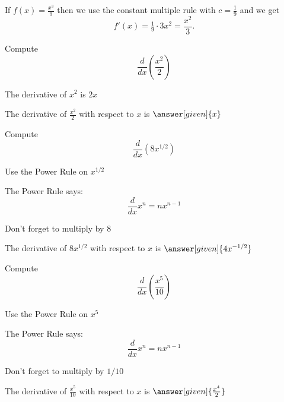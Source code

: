 \documentclass{ximera}
\begin{document}
\begin{example} %
 If $f(x) = \frac{x^3}{9}$ then  we use the constant multiple rule with $c = \frac19$ and we get 
\[
f'(x) = \tfrac19 \cdot 3x^2 
= \frac{x^2}{3}.
\]
\end{example}

\begin{problem} %
  Compute 
  \[
  \frac{d}{dx} \left(\frac{x^2}{2}\right)
  \]
  
    \begin{hint}
      The derivative of $x^2$ is $2x$
    \end{hint}    
		The derivative of $\frac{x^2}{2}$ with respect to $x$ is
		 $\answer[given]{x}$
	
\end{problem}

\begin{problem} %
  Compute 
  \[
  \frac{d}{dx} \left(8x^{1/2}\right)
  \]
  
    \begin{hint}
      Use the Power Rule on $x^{1/2}$
    \end{hint}
    \begin{hint}
      The Power Rule says:
      \[
      \frac{d}{dx} x^n = nx^{n-1}
      \]
    \end{hint}
		\begin{hint}
		  Don't forget to multiply by $8$
		\end{hint}
		The derivative of $8x^{1/2}$ with respect to $x$ is
		 $\answer[given]{4x^{-1/2}}$
	
\end{problem}

\begin{problem} %
  Compute 
  \[
  \frac{d}{dx} \left(\frac{x^5}{10}\right)
  \]
  
    \begin{hint}
      Use the Power Rule on $x^5$
    \end{hint}
    \begin{hint}
      The Power Rule says:
      \[
      \frac{d}{dx} x^n = nx^{n-1}
      \]
    \end{hint}
		\begin{hint}
		  Don't forget to multiply by $1/10$
		\end{hint}
		
		The derivative of $\frac{x^5}{10}$ with respect to $x$ is
		 $\answer[given]{\frac{x^4}{2}}$
	
\end{problem}
\end{document}
